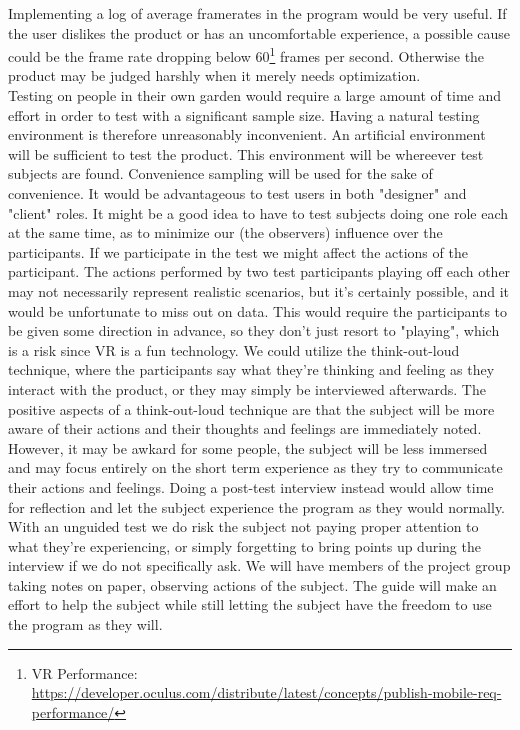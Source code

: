 Implementing a log of average framerates in the program would be very useful. If the user dislikes the product or has an uncomfortable experience, a possible cause could be the frame rate dropping below 60\footnote{VR Performance: \url{https://developer.oculus.com/distribute/latest/concepts/publish-mobile-req-performance/}} frames per second. Otherwise the product may be judged harshly when it merely needs optimization.\\
Testing on people in their own garden would require a large amount of time and effort in order to test with a significant sample size. Having a natural testing environment is therefore unreasonably inconvenient. An artificial environment will be sufficient to test the product. This environment will be whereever test subjects are found. Convenience sampling will be used for the sake of convenience. 
It would be advantageous to test users in both "designer" and "client" roles. It might be a good idea to have to test subjects doing one role each at the same time, as to minimize our (the observers) influence over the participants. If we participate in the test we might affect the actions of the participant. The actions performed by two test participants playing off each other may not necessarily represent realistic scenarios, but it's certainly possible, and it would be unfortunate to miss out on data. This would require the participants to be given some direction in advance, so they don't just resort to "playing", which is a risk since VR is a fun technology. We could utilize the think-out-loud technique, where the participants say what they're thinking and feeling as they interact with the product, or they may simply be interviewed afterwards.   
The positive aspects of a think-out-loud technique are that the subject will be more aware of their actions and their thoughts and feelings are immediately noted. However, it may be awkard for some people, the subject will be less immersed and may focus entirely on the short term experience as they try to communicate their actions and feelings. Doing a post-test interview instead would allow time for reflection and let the subject experience the program as they would normally. With an unguided test we do risk the subject not paying proper attention to what they're experiencing, or simply forgetting to bring points up during the interview if we do not specifically ask. We will have members of the project group taking notes on paper, observing actions of the subject. The guide will make an effort to help the subject while still letting the subject have the freedom to use the program as they will.

